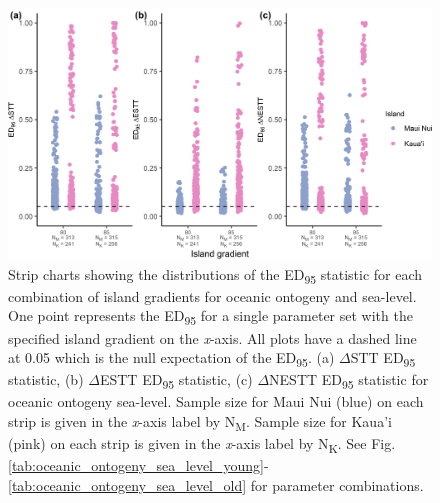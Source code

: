 \begin{figure}
    \centering
    \includegraphics{oceanic_ontogeny_sea_level_gradient_nltt.png}
    \caption{Strip charts showing the distributions of the ED\textsubscript{95} statistic for each combination of island gradients for oceanic ontogeny and sea-level. One point represents the ED\textsubscript{95} for a single parameter set with the specified island gradient on the \textit{x}-axis. All plots have a dashed line at 0.05 which is the null expectation of the ED\textsubscript{95}. (a) $\Delta$STT ED\textsubscript{95} statistic, (b) $\Delta$ESTT ED\textsubscript{95} statistic, (c) $\Delta$NESTT ED\textsubscript{95} statistic for oceanic ontogeny sea-level. Sample size for Maui Nui (blue) on each strip is given in the \textit{x}-axis label by N\textsubscript{M}. Sample size for Kaua'i (pink) on each strip is given in the \textit{x}-axis label by N\textsubscript{K}.  See Fig. \ref{tab:oceanic_ontogeny_sea_level_young}-\ref{tab:oceanic_ontogeny_sea_level_old} for parameter combinations.}
    \label{fig:oceanic_ontogeny_sea_level_gradient_nltt}
\end{figure}

